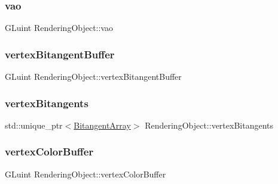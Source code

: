 \subsubsection{\texorpdfstring{vao}{vao}}
{\footnotesize\ttfamily G\+Luint Rendering\+Object\+::vao\hspace{0.3cm}{\ttfamily [protected]}}

\hypertarget{class_rendering_object_a0c2f16211e989dd4d9d2ebbf7c027fb6}{}\label{class_rendering_object_a0c2f16211e989dd4d9d2ebbf7c027fb6} 
\subsubsection{\texorpdfstring{vertex\+Bitangent\+Buffer}{vertexBitangentBuffer}}
{\footnotesize\ttfamily G\+Luint Rendering\+Object\+::vertex\+Bitangent\+Buffer\hspace{0.3cm}{\ttfamily [protected]}}

\hypertarget{class_rendering_object_a3d0ab70c5a87e4cd7fff87f3ee927678}{}\label{class_rendering_object_a3d0ab70c5a87e4cd7fff87f3ee927678} 
\subsubsection{\texorpdfstring{vertex\+Bitangents}{vertexBitangents}}
{\footnotesize\ttfamily std\+::unique\+\_\+ptr$<$\hyperlink{class_rendering_object_a6c6bf305a5f0f9ce1006f374c753c856}{Bitangent\+Array}$>$ Rendering\+Object\+::vertex\+Bitangents\hspace{0.3cm}{\ttfamily [protected]}}

\hypertarget{class_rendering_object_aeb014a4ef24e2fc4665a769241660cad}{}\label{class_rendering_object_aeb014a4ef24e2fc4665a769241660cad} 
\subsubsection{\texorpdfstring{vertex\+Color\+Buffer}{vertexColorBuffer}}
{\footnotesize\ttfamily G\+Luint Rendering\+Object\+::vertex\+Color\+Buffer\hspace{0.3cm}{\ttfamily [protected]}}



